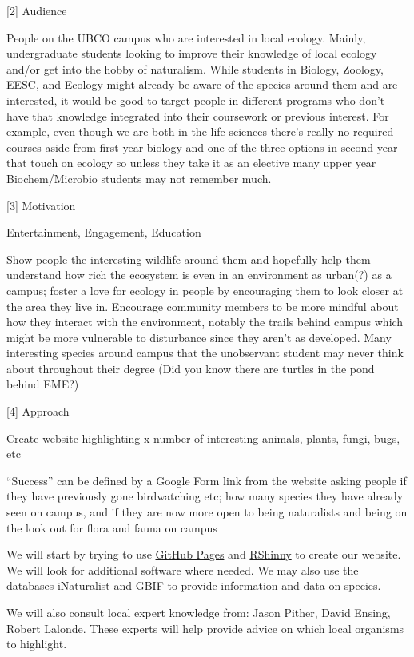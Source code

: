 \documentclass[
]{book}
\begin{document}
{{[}2{]} Audience}

People on the UBCO campus who are interested in local ecology. Mainly, undergraduate students looking to improve their knowledge of local ecology and/or get into the hobby of naturalism. While students in Biology, Zoology, EESC, and Ecology might already be aware of the species around them and are interested, it would be good to target people in different programs who don't have that knowledge integrated into their coursework or previous interest. For example, even though we are both in the life sciences there's really no required courses aside from first year biology and one of the three options in second year that touch on ecology so unless they take it as an elective many upper year Biochem/Microbio students may not remember much.

{{[}3{]} Motivation}

Entertainment, Engagement, Education

Show people the interesting wildlife around them and hopefully help them understand how rich the ecosystem is even in an environment as urban(?) as a campus; foster a love for ecology in people by encouraging them to look closer at the area they live in. Encourage community members to be more mindful about how they interact with the environment, notably the trails behind campus which might be more vulnerable to disturbance since they aren't as developed. Many interesting species around campus that the unobservant student may never think about throughout their degree (Did you know there are turtles in the pond behind EME?)

{{[}4{]} Approach}

Create website highlighting x number of interesting animals, plants, fungi, bugs, etc

``Success'' can be defined by a Google Form link from the website asking people if they have previously gone birdwatching etc; how many species they have already seen on campus, and if they are now more open to being naturalists and being on the look out for flora and fauna on campus

We will start by trying to use \href{https://docs.github.com/en/pages}{GitHub Pages} and \href{https://shiny.rstudio.com}{RShinny} to create our website. We will look for additional software where needed. We may also use the databases iNaturalist and GBIF to provide information and data on species.

We will also consult local expert knowledge from: Jason Pither, David Ensing, Robert Lalonde. These experts will help provide advice on which local organisms to highlight.
\end{document}
